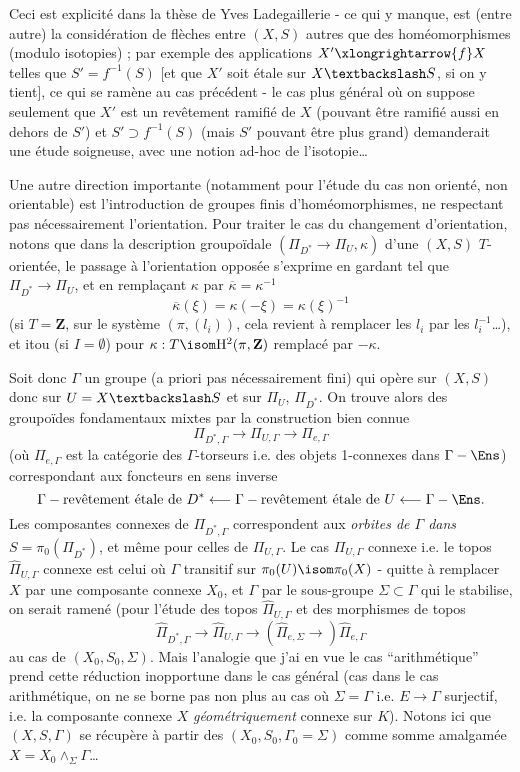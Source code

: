 Ceci est explicité dans la thèse de Yves Ladegaillerie - ce qui y manque, est (entre autre) la considération de flèches entre $(X, S)$ autres que des homéomorphismes (modulo isotopies) ; par exemple des applications $X' \xlongrightarrow{f} X$ telles que $S' = f^{-1}(S)$ [et que $X'$ soit étale sur $X \textbackslash S$, si on y tient], ce qui se ramène au cas précédent - le cas plus général où on suppose seulement que $X'$ est un revêtement ramifié de $X$ (pouvant être ramifié aussi en dehors de $S'$) et $S' \supset f^{-1} (S)$ (mais $S'$ pouvant être plus grand) demanderait une étude soigneuse, avec une notion ad-hoc de l'isotopie\dots

Une autre direction importante (notamment pour l'étude du cas non orienté, non orientable) est l'introduction de groupes finis d'homéomorphismes, ne respectant pas nécessairement l'orientation. Pour traiter le cas du changement d'orientation, notons que dans la description groupoïdale $(\Pi_{D^*} \to \Pi_{U}, \kappa)$ d'une $(X, S)$ $T$-orientée, le passage à l'orientation opposée s'exprime en gardant tel que $\Pi_{D^*} \to \Pi_U$, et en rempla\c{c}ant $\kappa$ par $\overline{\kappa} = \kappa^{-1}$
$$
\overline{\kappa}(\xi) = \kappa(-\xi) = \kappa(\xi)^{-1}
$$
(si $T = \mathbf{Z}$, sur le système $(\pi, (l_i))$, cela revient à remplacer les $l_i$ par les $l^{-1}_i$\dots), et itou (si $I = \emptyset$) pour $\kappa: T \isom \mathrm{H}^2(\pi, \mathbf{Z})$ remplacé par $-\kappa$.

Soit donc $\Gamma$ un groupe (a priori pas nécessairement fini) qui opère sur $(X, S)$ donc sur $U = X \textbackslash S$ et sur $\Pi_U$, $\Pi_{D^*}$. On trouve alors des groupoïdes fondamentaux mixtes par la construction bien connue
$$
\Pi_{D^*, \Gamma} \to \Pi_{U, \Gamma} \to \Pi_{e, \Gamma}
$$
(où $\Pi_{e, \Gamma}$ est la catégorie des $\Gamma$-torseurs i.e. des objets 1-connexes dans $\Gamma-\Ens$) correspondant aux foncteurs en sens inverse
$$
\Gamma-\text{revêtement étale de}~D^* \longleftarrow \Gamma-\text{revêtement étale de}~U \longleftarrow \Gamma-\Ens.
$$
Les composantes connexes de $\Pi_{D^*, \Gamma}$ correspondent aux \emph{orbites de $\Gamma$ dans $S = \pi_0(\Pi_{D^*})$}, et même pour celles de $\Pi_{U, \Gamma}$. Le cas $\Pi_{U, \Gamma}$ connexe i.e. le topos $\hat{\Pi}_{U, \Gamma}$ connexe est celui où $\Gamma$ transitif sur $\pi_0(U) \isom \pi_0(X)$ - quitte à remplacer $X$ par une composante connexe $X_0$, et $\Gamma$ par le sous-groupe $\Sigma \subset  \Gamma$ qui le stabilise, on serait ramené (pour l'étude des topos $\hat{\Pi}_{U, \Gamma}$ et des morphismes de topos
$$
\hat{\Pi}_{D^*, \Gamma} \to \hat{\Pi}_{U, \Gamma} \to (\hat{\Pi}_{e, \Sigma} \to) \hat{\Pi}_{e, \Gamma}
$$
au cas de $(X_0, S_0, \Sigma)$. Mais l'analogie que j'ai en vue le cas ``arithmétique'' prend cette réduction inopportune dans le cas général (cas dans le cas arithmétique, on ne se borne pas non plus au cas où $\Sigma = \Gamma$ i.e. $E \to \Gamma$ surjectif, i.e. la composante connexe $X$ \emph{géométriquement} connexe sur $K$). Notons ici que $(X, S, \Gamma)$ se récupère à partir des $(X_0, S_0, \Gamma_0 = \Sigma)$ comme somme amalgamée $X = X_0 \wedge_\Sigma \Gamma$\dots

